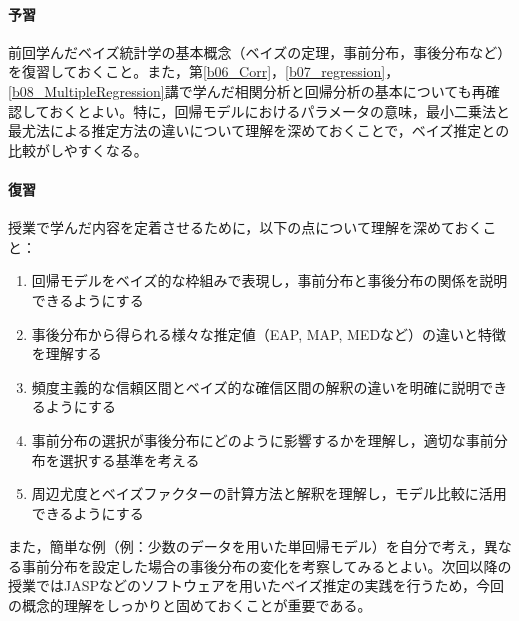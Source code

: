 \paragraph{予習}
前回学んだベイズ統計学の基本概念（ベイズの定理，事前分布，事後分布など）を復習しておくこと。また，第\ref{b06_Corr}，\ref{b07_regression}，\ref{b08_MultipleRegression}講で学んだ相関分析と回帰分析の基本についても再確認しておくとよい。特に，回帰モデルにおけるパラメータの意味，最小二乗法と最尤法による推定方法の違いについて理解を深めておくことで，ベイズ推定との比較がしやすくなる。

\paragraph{復習}
授業で学んだ内容を定着させるために，以下の点について理解を深めておくこと：

\begin{enumerate}
\item 回帰モデルをベイズ的な枠組みで表現し，事前分布と事後分布の関係を説明できるようにする
\item 事後分布から得られる様々な推定値（EAP, MAP, MEDなど）の違いと特徴を理解する
\item 頻度主義的な信頼区間とベイズ的な確信区間の解釈の違いを明確に説明できるようにする
\item 事前分布の選択が事後分布にどのように影響するかを理解し，適切な事前分布を選択する基準を考える
\item 周辺尤度とベイズファクターの計算方法と解釈を理解し，モデル比較に活用できるようにする
\end{enumerate}

また，簡単な例（例：少数のデータを用いた単回帰モデル）を自分で考え，異なる事前分布を設定した場合の事後分布の変化を考察してみるとよい。次回以降の授業ではJASPなどのソフトウェアを用いたベイズ推定の実践を行うため，今回の概念的理解をしっかりと固めておくことが重要である。